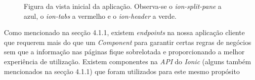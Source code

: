\begin{figure}[h]
	\begin{center}
	\end{center}
	\caption{Figura da vista inicial da aplicação. Observa-se o \textit{ion-split-pane} a azul, o \textit{ion-tabs} a vermelho e o \textit{ion-header} a verde.}\label{fig:maincomponent}
\end{figure}
\pagebreak

Como mencionado na secção 4.1.1, existem \textit{endpoints} na nossa aplicação cliente que requerem mais do que um \textit{Component} para garantir certas regras de negócios sem que a informação nas páginas fique sobrelotada e proporcionando a melhor experiência de utilização. Existem componentes na \textit{API} do \textit{Ionic} (alguns também mencionados na secção 4.1.1) que foram utilizados para este mesmo propósito\\


